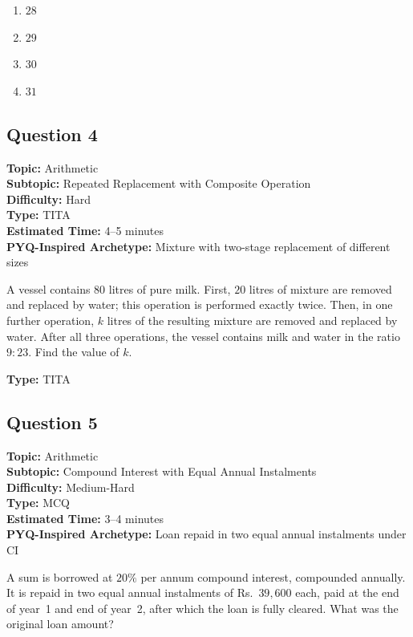\documentclass[11pt]{article}
\begin{document}
\begin{enumerate}[label=(\Alph*)]
    \item \(28\)
    \item \(29\)
    \item \(30\)
    \item \(31\)
\end{enumerate}

\subsection*{Question 4}

\textbf{Topic:} Arithmetic \\
\textbf{Subtopic:} Repeated Replacement with Composite Operation \\
\textbf{Difficulty:} Hard \\
\textbf{Type:} TITA \\
\textbf{Estimated Time:} 4--5 minutes \\
\textbf{PYQ-Inspired Archetype:} Mixture with two-stage replacement of different sizes

\begin{tcolorbox}
A vessel contains \(80\) litres of pure milk. First, \(20\) litres of mixture are removed and replaced by water; this operation is performed exactly twice. Then, in one further operation, \(k\) litres of the resulting mixture are removed and replaced by water. After all three operations, the vessel contains milk and water in the ratio \(9:23\). Find the value of \(k\).
\end{tcolorbox}

\textbf{Type:} TITA

\subsection*{Question 5}

\textbf{Topic:} Arithmetic \\
\textbf{Subtopic:} Compound Interest with Equal Annual Instalments \\
\textbf{Difficulty:} Medium-Hard \\
\textbf{Type:} MCQ \\
\textbf{Estimated Time:} 3--4 minutes \\
\textbf{PYQ-Inspired Archetype:} Loan repaid in two equal annual instalments under CI

\begin{tcolorbox}
A sum is borrowed at \(20\%\) per annum compound interest, compounded annually. It is repaid in two equal annual instalments of Rs.~\(39{,}600\) each, paid at the end of year~1 and end of year~2, after which the loan is fully cleared. What was the original loan amount?
\end{tcolorbox}
\end{document}
